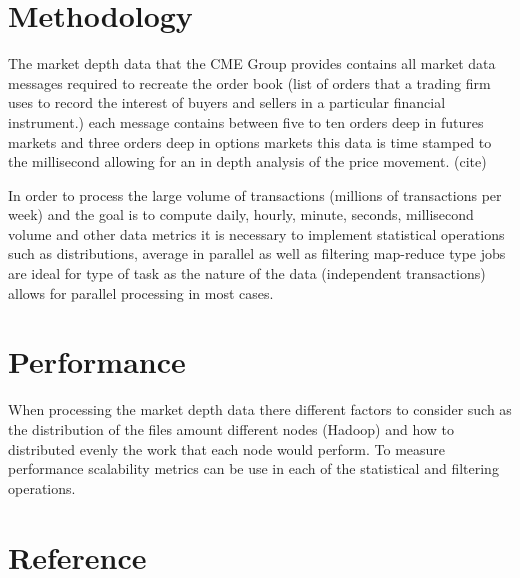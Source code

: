 \documentclass[12pt]{article} %
\begin{document}
\section{Methodology}

The market depth data that the CME Group provides contains all market data messages required to recreate the order book (list of orders that a trading firm uses to record the interest of buyers and sellers in a particular financial instrument.) each message contains between five to ten orders deep in futures markets and three orders deep in options markets this data is time stamped to the millisecond allowing for an in depth analysis of the price movement. (cite)

In order to process the large volume of transactions (millions of transactions per week) and the goal is to compute daily, hourly, minute, seconds, millisecond volume and other data metrics it is necessary to implement statistical operations such as distributions, average in parallel as well as filtering map-reduce type jobs are ideal for type of task as the nature of the data (independent transactions) allows for parallel processing in most cases.


\section{Performance}

When processing the market depth data there different factors to consider such as the distribution of the files amount different nodes (Hadoop) and how to distributed evenly the work that each node would perform. To measure performance  scalability metrics can be use in each of the statistical and filtering operations.

\newpage

\section{Reference}
\end{document}
